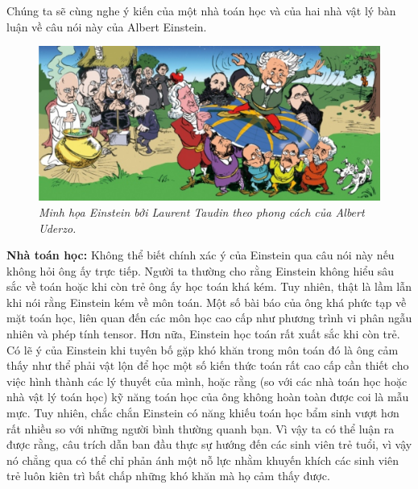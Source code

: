 \begin{multicols}{2}
	
	\vspace*{-8pt}
	\vskip 0.2cm	
	Chúng ta sẽ cùng nghe ý kiến của một nhà toán học và của hai nhà vật lý bàn luận về câu nói này của Albert Einstein.
	\begin{figure}[H]
		\vspace*{-5pt}
		\centering
		\captionsetup{labelformat= empty, justification=centering}
		\includegraphics[width= 1\linewidth]{2}
		\caption{\small\textit{\color{quantoan}Minh họa Einstein bởi Laurent Taudin theo phong cách của Albert Uderzo.}}
		\vspace*{-10pt}
	\end{figure}
	\textbf{\color{quantoan}Nhà toán học:} Không thể biết chính xác ý của Einstein qua câu nói này nếu không hỏi ông ấy trực tiếp. Người ta thường cho rằng Einstein không hiểu sâu sắc về toán hoặc khi còn trẻ ông ấy học toán khá kém. Tuy nhiên, thật là lầm lẫn khi nói rằng Einstein kém về môn toán. Một số bài báo của ông khá phức tạp về mặt toán học, liên quan đến các môn học cao cấp như phương trình vi phân ngẫu nhiên và phép tính tensor. Hơn nữa, Einstein học toán rất xuất sắc khi còn trẻ.
	\vskip 0.1cm
	Có lẽ ý của Einstein khi tuyên bố gặp khó khăn trong môn toán đó là ông cảm thấy như thể phải vật lộn để học một số kiến thức toán rất cao cấp cần thiết cho việc hình thành các lý thuyết của mình, hoặc rằng (so với các nhà toán học hoặc nhà vật lý toán học) kỹ năng toán học của ông không hoàn toàn được coi là mẫu mực. Tuy nhiên, chắc chắn Einstein có năng khiếu toán học bẩm sinh vượt hơn rất nhiều so với những người bình thường quanh bạn. Vì vậy ta có thể luận ra được rằng, câu trích dẫn ban đầu thực sự hướng đến các sinh viên trẻ tuổi, vì vậy nó chẳng qua  có thể chỉ phản ánh một nỗ lực nhằm  khuyến khích các sinh viên trẻ luôn kiên trì bất chấp những khó khăn mà họ cảm thấy được.

\end{multicols}
